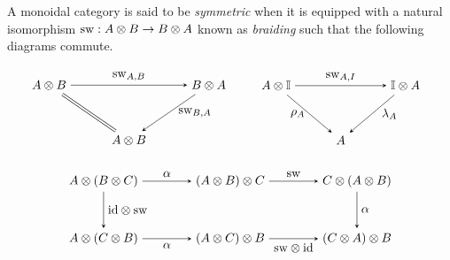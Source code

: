 \begin{definition}
  A monoidal category is said to be \emph{symmetric} when it is
equipped with a natural isomorphism $\mathrm{sw} : A \otimes B \rightarrow B \otimes A$ known as \emph{braiding} such that the following diagrams commute.


\[
\begin{minipage}{0.45\textwidth}
\centering
\begin{tikzpicture}
  \matrix (m) [matrix of math nodes,row sep=3em,column sep=3em,minimum width=1em]
  {
    A \otimes B &   & B \otimes A  \\
     & A \otimes B & \\
  };
  \path[-stealth]
    (m-1-1) edge  node [above] {$\sw_{A,B}$} (m-1-3)
    (m-1-3) edge  node [right=0.15cm] {$\sw_{B,A}$} (m-2-2);
  \draw[double equal sign distance] (m-1-1) -- (m-2-2);
\end{tikzpicture}
\end{minipage}
\quad \quad \
\begin{minipage}{0.45\textwidth}
\centering
\begin{tikzpicture}
  \matrix (m) [matrix of math nodes,row sep=3em,column sep=3em,minimum width=1em]
  {
    A \otimes\mathbb{I}&   & \mathbb{I}\otimes A \\
     & A & \\
  };
  \path[-stealth]
    (m-1-1) edge  node [above] {$\sw_{A,I}$} (m-1-3)
    (m-1-1) edge  node [left] {$\rho_A$} (m-2-2)
    (m-1-3) edge  node [right=0.15cm] {$\lambda_A$} (m-2-2);
\end{tikzpicture}
\end{minipage}
\]

$$
\begin{tikzpicture}
  \matrix (m) [matrix of math nodes,row sep=3em,column sep=4em,minimum width=1em]
  {
  A \otimes (B \otimes C)  & (A \otimes B) \otimes C & C \otimes (A \otimes B) \\
  A \otimes (C \otimes B) & (A \otimes C) \otimes B & (C \otimes A) \otimes B\\
  };
  \path[-stealth]
    (m-1-1) edge  node [above] {$\alpha$} (m-1-2)
    (m-1-2) edge  node [above] {$\sw$} (m-1-3)
    (m-1-3) edge  node [right] {$\alpha$} (m-2-3)
    (m-2-2) edge  node [below] {$\sw \otimes \id$} (m-2-3)
    (m-2-1) edge  node [below] {$\alpha$} (m-2-2)
    (m-1-1) edge  node [right] {$\id \otimes \sw$} (m-2-1)
    ;
\end{tikzpicture}
$$

\end{definition}


